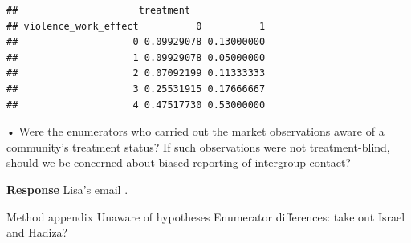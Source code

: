 \documentclass[
]{article}
\begin{document}
\begin{verbatim}
##                     treatment
## violence_work_effect          0          1
##                    0 0.09929078 0.13000000
##                    1 0.09929078 0.05000000
##                    2 0.07092199 0.11333333
##                    3 0.25531915 0.17666667
##                    4 0.47517730 0.53000000
\end{verbatim}

• Were the enumerators who carried out the market observations aware of
a community's treatment status? If such observations were not
treatment-blind, should we be concerned about biased reporting of
intergroup contact?

\textbf{Response} Lisa's email .

Method appendix Unaware of hypotheses Enumerator differences: take out
Israel and Hadiza?
\end{document}
